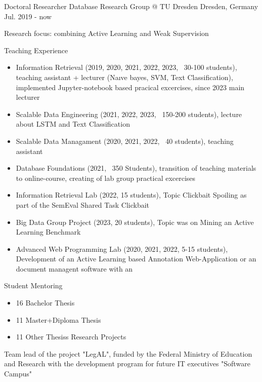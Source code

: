 \begin{cventries}



	\cventry
	{Doctoral Researcher}
	{Database Research Group @ TU Dresden}
	{Dresden, Germany}
	{Jul. 2019 - now}
	{
		\begin{cvitems}
			\item{Research focus: combining Active Learning and Weak Supervision}
			\item{Teaching Experience
   \begin{itemize}
       \item Information Retrieval (2019, 2020, 2021, 2022, 2023, ~30-100 students), teaching assistant + lecturer (Na\i{}ve bayes, SVM, Text Classification), implemented Jupyter-notebook based pracical excercises, since 2023 main lecturer
       \item Scalable Data Engineering (2021, 2022, 2023, ~150-200 students), lecture about LSTM and Text Classification
       \item Scalable Data Managament (2020, 2021, 2022, ~40 students), teaching assistant
       \item Database Foundations (2021, ~350 Students), transition of teaching materials to online-course, creating of lab group practical excercises
       \item Information Retrieval Lab (2022, 15 students), Topic Clickbait Spoiling as part of the SemEval Shared Task Clickbait
       \item Big Data Group Project (2023, 20 students), Topic was on Mining an Active Learning Benchmark
       \item Advanced Web Programming Lab (2020, 2021, 2022, 5-15 students), Development of an Active Learning based Annotation Web-Application or an document managent software with an
   \end{itemize}
   }
            \item{Student Mentoring
            \begin{itemize}
                \item 16 Bachelor Thesis
                \item 11 Master+Diploma Thesis
                \item 11 Other Thesiss Research Projects
            \end{itemize}
            }
            \item{Team lead of the project "LegAL", funded by the Federal Ministry of Education and Research with the development program for future IT executives "Software Campus"}

\end{cvitems}}
\end{cventries}
